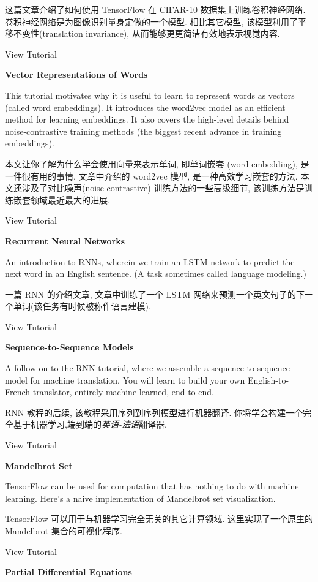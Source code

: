 这篇文章介绍了如何使用 TensorFlow 在 CIFAR-10 数据集上训练卷积神经网络. 卷积神经网络是为图像识别量身定做的一个模型. 相比其它模型, 该模型利用了平移不变性(translation invariance), 从而能够更更简洁有效地表示视觉内容.

View Tutorial

\textbf{Vector Representations of Words}

This tutorial motivates why it is useful to learn to represent words as vectors (called word embeddings). It introduces the word2vec model as an efficient method for learning embeddings. It also covers the high-level details behind noise-contrastive training methods (the biggest recent advance in training embeddings).

本文让你了解为什么学会使用向量来表示单词, 即单词嵌套 (word embedding), 是一件很有用的事情. 文章中介绍的 word2vec 模型, 是一种高效学习嵌套的方法. 本文还涉及了对比噪声(noise-contrastive) 训练方法的一些高级细节, 该训练方法是训练嵌套领域最近最大的进展.

View Tutorial

\textbf{Recurrent Neural Networks}

An introduction to RNNs, wherein we train an LSTM network to predict the next word in an English sentence. (A task sometimes called language modeling.)

一篇 RNN 的介绍文章, 文章中训练了一个 LSTM 网络来预测一个英文句子的下一个单词(该任务有时候被称作语言建模).

View Tutorial

\textbf{Sequence-to-Sequence Models}

A follow on to the RNN tutorial, where we assemble a sequence-to-sequence model for machine translation. You will learn to build your own English-to-French translator, entirely machine learned, end-to-end.

RNN 教程的后续, 该教程采用序列到序列模型进行机器翻译. 你将学会构建一个完全基于机器学习,端到端的\emph{英语-法语}翻译器.

View Tutorial

\textbf{Mandelbrot Set}

TensorFlow can be used for computation that has nothing to do with machine learning. Here's a naive implementation of Mandelbrot set visualization.

TensorFlow 可以用于与机器学习完全无关的其它计算领域. 这里实现了一个原生的 Mandelbrot 集合的可视化程序.

View Tutorial

\textbf{Partial Differential Equations}

